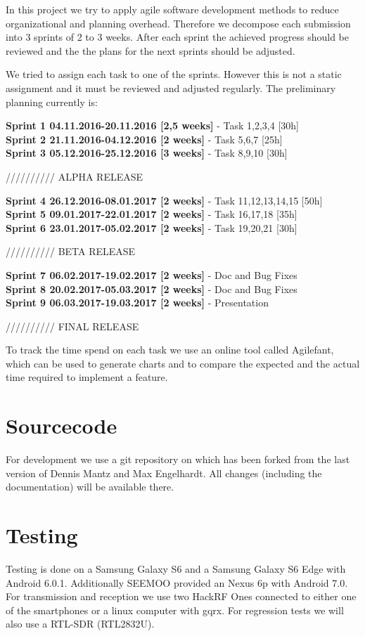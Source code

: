 In this project we try to apply agile software development methods to reduce organizational and planning overhead. Therefore we decompose each submission into 3 sprints of 2 to 3 weeks. After each sprint the achieved progress should be reviewed and the the plans for the next sprints should be adjusted. 

We tried to assign each task to one of the sprints. However this is not a static assignment and it must be reviewed and adjusted regularly. The preliminary planning currently is: 


\noindent\textbf{Sprint 1 04.11.2016-20.11.2016 [2,5 weeks]} 
- Task 1,2,3,4 [30h]\\
\textbf{Sprint 2 21.11.2016-04.12.2016 [2 weeks]}
- Task 5,6,7 [25h]\\
\textbf{Sprint 3 05.12.2016-25.12.2016 [3 weeks]}
- Task 8,9,10 [30h]

////////// ALPHA RELEASE

\noindent\textbf{Sprint 4 26.12.2016-08.01.2017 [2 weeks]}
- Task 11,12,13,14,15 [50h]\\
\textbf{Sprint 5 09.01.2017-22.01.2017 [2 weeks]}
- Task 16,17,18 [35h]\\
\textbf{Sprint 6 23.01.2017-05.02.2017 [2 weeks]}
- Task 19,20,21 [30h]


////////// BETA RELEASE

\noindent\textbf{Sprint 7 06.02.2017-19.02.2017 [2 weeks]}
- Doc and Bug Fixes\\
\textbf{Sprint 8 20.02.2017-05.03.2017 [2 weeks]}
- Doc and Bug Fixes\\
\textbf{Sprint 9 06.03.2017-19.03.2017 [2 weeks]}
- Presentation 

////////// FINAL RELEASE

To track the time spend on each task we use an online tool called Agilefant, which can be used to generate charts and to compare the expected and the actual time required to implement a feature. 

\section{Sourcecode}

For development we use a git repository on \cite{ANSIAN_GitHub} which has been forked from the last version of Dennis Mantz and Max Engelhardt. All changes (including the documentation) will be available there.

\section{Testing}

Testing is done on a Samsung Galaxy S6 and a Samsung Galaxy S6 Edge with Android 6.0.1. 
Additionally SEEMOO provided an Nexus 6p with Android 7.0. 
For transmission and reception we use two HackRF Ones connected to either one of the smartphones or a linux computer with gqrx. For regression tests we will also use a RTL-SDR (RTL2832U).